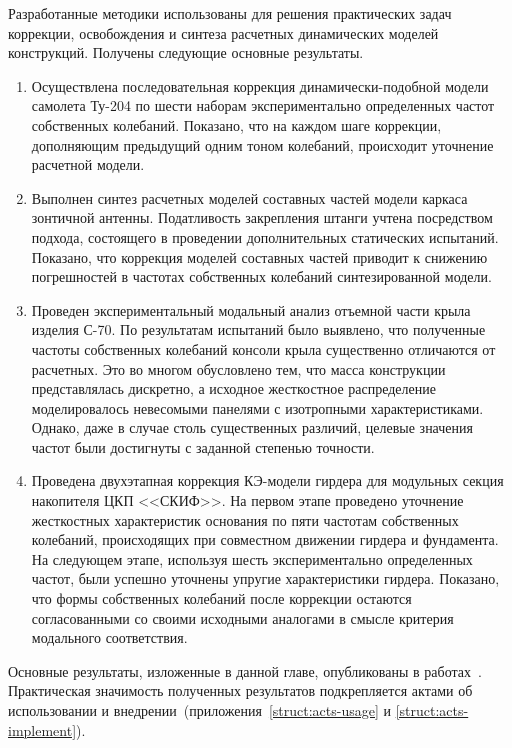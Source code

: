 Разработанные методики использованы для решения практических задач коррекции, освобождения и синтеза расчетных динамических моделей конструкций. Получены следующие основные результаты.
\begin{enumerate}
	\item Осуществлена последовательная коррекция динамически-подобной модели самолета Ту-204 по шести наборам экспериментально определенных частот собственных колебаний. Показано, что на каждом шаге коррекции, дополняющим предыдущий одним тоном колебаний, происходит уточнение расчетной модели.
	\item Выполнен синтез расчетных моделей составных частей модели каркаса зонтичной антенны. Податливость закрепления штанги учтена посредством подхода, состоящего в проведении дополнительных статических испытаний. Показано, что коррекция моделей составных частей приводит к снижению погрешностей в частотах собственных колебаний синтезированной модели.
	\item Проведен экспериментальный модальный анализ отъемной части крыла изделия С-70. По результатам испытаний было выявлено, что полученные частоты собственных колебаний консоли крыла существенно отличаются от расчетных. Это во многом обусловлено тем, что масса конструкции представлялась дискретно, а исходное жесткостное распределение моделировалось невесомыми панелями с изотропными характеристиками. Однако, даже в случае столь существенных различий, целевые значения частот были достигнуты с заданной степенью точности. 
	\item Проведена двухэтапная коррекция КЭ-модели гирдера для модульных секция накопителя ЦКП <<СКИФ>>. На первом этапе проведено уточнение жесткостных характеристик основания по пяти частотам собственных колебаний, происходящих при совместном движении гирдера и фундамента. На следующем этапе, используя шесть экспериментально определенных частот, были успешно уточнены упругие характеристики гирдера. Показано, что формы собственных колебаний после коррекции остаются согласованными со своими исходными аналогами в смысле критерия модального соответствия.
\end{enumerate}

Основные результаты, изложенные в данной главе, опубликованы в работах~\cite{lib:author:chinese:updating, lib:author:iss2021:updating, lib:author:dvm:updating, lib:author:iss2022:updating}. Практическая значимость полученных результатов подкрепляется актами об использовании и внедрении~(приложения~\ref{struct:acts-usage} и \ref{struct:acts-implement}).